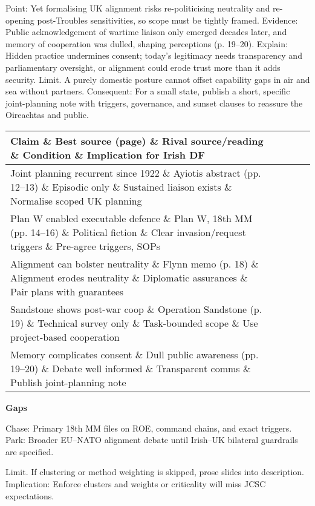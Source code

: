 Point: Yet formalising UK alignment risks re-politicising neutrality and re-opening post-Troubles sensitivities, so scope must be tightly framed.
Evidence: Public acknowledgement of wartime liaison only emerged decades later, and memory of cooperation was dulled, shaping perceptions (p. 19–20).
Explain: Hidden practice undermines consent; today’s legitimacy needs transparency and parliamentary oversight, or alignment could erode trust more than it adds security.
Limit. A purely domestic posture cannot offset capability gaps in air and sea without partners.
Consequent: For a small state, publish a short, specific joint-planning note with triggers, governance, and sunset clauses to reassure the Oireachtas and public.
\begin{tabular}{p{3.2cm}p{4.2cm}p{3.6cm}p{3.2cm}p{4.2cm}}
	\textbf{Claim} \& \textbf{Best source (page)} \& \textbf{Rival source/reading} \& \textbf{Condition} \& \textbf{Implication for Irish DF}\\\hline
	Joint planning recurrent since 1922 \& Ayiotis abstract (pp. 12–13) \& Episodic only \& Sustained liaison exists \& Normalise scoped UK planning \\
	Plan W enabled executable defence \& Plan W, 18th MM (pp. 14–16) \& Political fiction \& Clear invasion/request triggers \& Pre-agree triggers, SOPs \\
	Alignment can bolster neutrality \& Flynn memo (p. 18) \& Alignment erodes neutrality \& Diplomatic assurances \& Pair plans with guarantees \\
	Sandstone shows post-war coop \& Operation Sandstone (p. 19) \& Technical survey only \& Task-bounded scope \& Use project-based cooperation \\
	Memory complicates consent \& Dull public awareness (pp. 19–20) \& Debate well informed \& Transparent comms \& Publish joint-planning note \\
\end{tabular}

\bigskip

\noindent\textbf{Gaps}

\noindent Chase: Primary 18th MM files on ROE, command chains, and exact triggers.\\
Park: Broader EU–NATO alignment debate until Irish–UK bilateral guardrails are specified.

\noindent Limit. If clustering or method weighting is skipped, prose slides into description.\\
Implication: Enforce clusters and weights or criticality will miss JCSC expectations.

